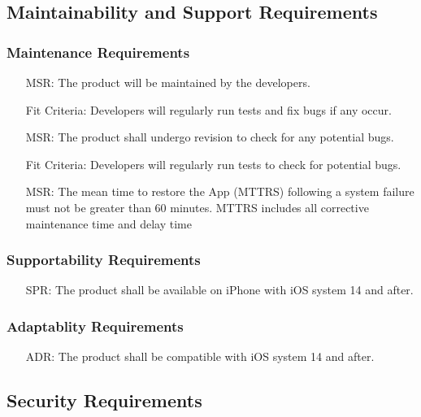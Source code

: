 \documentclass[12pt]{article}
\newcounter{reqnum} %
\newcounter{msrreqnum} %
\newcounter{adrreqnum} %
\newcounter{sprreqnum} %
\begin{document}
\subsection{Maintainability and Support Requirements}
\subsubsection{Maintenance Requirements}
\begin{itemize}
    \item[MSR\refstepcounter{msrreqnum}\themsrreqnum \label{R_Inputs}:] 
    The product will be maintained by the developers.
    \item[] Fit Criteria: Developers will regularly run tests and fix bugs if any occur.
    \item[MSR\refstepcounter{msrreqnum}\themsrreqnum \label{R_Inputs}:] 
    The product shall undergo revision to check for any potential bugs.
    \item[] Fit Criteria: Developers will regularly run tests to check for potential bugs.
    \item[MSR\refstepcounter{msrreqnum}\themsrreqnum \label{R_Inputs}:] 
    The mean time to restore the App (MTTRS) following a system failure must not be greater than 60 minutes. MTTRS includes all corrective maintenance time and delay time
\end{itemize}
\subsubsection{Supportability Requirements}
\begin{itemize}
    \item[SPR\refstepcounter{sprreqnum}\thesprreqnum \label{R_Inputs}:] 
    The product shall be available on iPhone with iOS system 14 and after.
\end{itemize}

\subsubsection{Adaptablity Requirements}
\begin{itemize}
    \item[ADR\refstepcounter{adrreqnum}\theadrreqnum \label{R_Inputs}:] 
    The product shall be compatible with iOS system 14 and after.
    
\end{itemize}

\subsection{Security Requirements}
\end{document}
